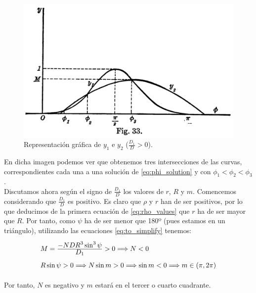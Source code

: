 \documentclass[11pt]{article}
\newcommand\ddfrac[2]{\frac{\displaystyle #1}{\displaystyle #2}}
\begin{document}
\begin{figure}[H]
\centering
\includegraphics[scale=0.5]{images/fig_33.png}
\caption{Representación gráfica de $y_1$ e $y_2$ ($\frac{D_1}{D}>0$).}
\label{fig:y1_y2_graph_positive}
\end{figure}

En dicha imagen podemos ver que obtenemos tres intersecciones de las curvas, correspondientes cada una a una solución de \eqref{eq:phi_solution} y con $\phi_1<\phi_2<\phi_3$.\\

Discutamos ahora según el signo de $\frac{D_1}{D}$ los valores de $r$, $R$ y $m$. Comencemos considerando que $\frac{D_1}{D}$ es positivo. Es claro que $\rho$ y $r$ han de ser positivos, por lo que deducimos de la primera ecuación de \eqref{eq:rho_values} que $r$ ha de ser mayor que $R$. Por tanto, como $\psi$ ha de ser menor que 180º (pues estamos en un triángulo), utilizando las ecuaciones \eqref{eq:to_simplify} tenemos:
\[
\def\arraystretch{2}
\begin{array}{l}
M=\ddfrac{-NDR^3\sin^3{\psi}}{D_1}>0 \Longrightarrow N<0 \\
R\sin{\psi}>0 \Longrightarrow N\sin{m}>0 \Longrightarrow \sin{m}<0 \Longrightarrow m\in(\pi,2\pi)
\end{array}
\]

Por tanto, $N$ es negativo y $m$ estará en el tercer o cuarto cuadrante.\\
\end{document}
